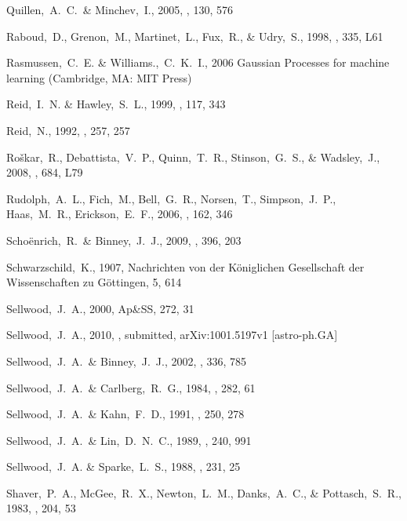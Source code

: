 \begin{thebibliography}{99}
  Quillen,~A.~C.~\& Minchev,~I., 2005,
  \aj, 130, 576

  Raboud,~D., Grenon,~M., Martinet,~L., Fux,~R., \& Udry,~S., 1998,
  \aap, 335, L61

  Rasmussen,~C.~E. \& Williams.,~C.~K.~I., 2006
  Gaussian Processes for machine learning (Cambridge, MA: MIT Press)

  Reid,~I.~N. \& Hawley,~S.~L., 1999,
  \aj, 117, 343

  Reid,~N., 1992,
  \mnras, 257, 257

  Ro{\v s}kar,~R., Debattista,~V.~P., Quinn,~T.~R., Stinson,~G.~S., \& Wadsley,~J., 2008,
  \apjl, 684, L79

  Rudolph,~A.~L., Fich,~M., Bell,~G.~R., Norsen,~T., Simpson,~J.~P., Haas,~M.~R., Erickson,~E.~F., 2006,
  \apjs, 162, 346

  Scho\"{e}nrich,~R.~\& Binney,~J.~J., 2009,
  \mnras, 396, 203

  Schwarzschild,~K., 1907, Nachrichten von der
  K\"{o}niglichen Gesellschaft der Wissenschaften zu G\"{o}ttingen, 5,
  614

  Sellwood,~J.~A., 2000,
  Ap\&SS, 272, 31

  Sellwood,~J.~A., 2010,
  \mnras, submitted, 
  arXiv:1001.5197v1 [astro-ph.GA] 

  Sellwood,~J.~A.~\& Binney,~J.~J., 2002,
  \mnras, 336, 785

  Sellwood,~J.~A.~\& Carlberg,~R.~G., 1984,
  \apj, 282, 61

  Sellwood,~J.~A.~\& Kahn,~F.~D., 1991,
  \mnras, 250, 278

  Sellwood,~J.~A.~\& Lin,~D.~N.~C., 1989,
  \mnras, 240, 991

  Sellwood,~J.~A. \& Sparke,~L.~S., 1988,
  \mnras, 231, 25

  Shaver,~P.~A., McGee,~R.~X., Newton,~L.~M., Danks,~A.~C., \& Pottasch,~S.~R., 1983,
  \mnras, 204, 53


\end{thebibliography}
